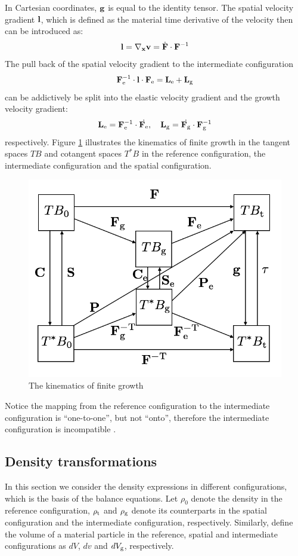 In Cartesian coordinates, $\bold{g}$ is equal to the identity tensor. The spatial velocity gradient $\bold{l}$, which is defined as the material time derivative of the velocity then can be introduced as:
\begin{equation}
\bold{l} = \nabla_{\bold{x}} \bold{v} = \dot{\bold{F}} \cdot \bold{F}^{-1}
\end{equation}
The pull back of the spatial velocity gradient to the intermediate configuration
\begin{equation}
\bold{F}_{\mathrm{e}}^{-1} \cdot \bold{l} \cdot \bold{F}_{\mathrm{e}} = \bold{L}_{\mathrm{e}} + \bold{L}_{\mathrm{g}}
\end{equation} 
can be addictively be split into the elastic velocity gradient and the growth velocity gradient:
\begin{equation} \label{eq:L}
\bold{L}_\mathrm{e} = \bold{F}_\mathrm{e}^{-1} \cdot \dot{\bold{F}_\mathrm{e}}, \quad \bold{L}_\mathrm{g} = \dot{\bold{F}_\mathrm{g}} \cdot \bold{F}_\mathrm{g}^{-1} 
\end{equation}
respectively. Figure \ref{fig:configurations} illustrates the kinematics of finite growth in the tangent spaces $TB$ and cotangent spaces $T^*B$ in the reference configuration, the intermediate configuration and the spatial configuration.

\begin{figure}[H]
   \centering
   \includegraphics[width=.5\textwidth]{./figures/configurations.png} %
   \caption{The kinematics of finite growth}
   \label{fig:configurations}
\end{figure}

Notice the mapping from the reference configuration to the intermediate configuration is ``one-to-one'', but not ``onto'', therefore the intermediate configuration is incompatible \cite{Cowin}.

\subsection{Density transformations}
In this section we consider the density expressions in different configurations, which is the basis of the balance equations. Let $\rho_0$ denote the density in the reference configuration, $\rho_{\mathrm{t}}$ and $\rho_{\mathrm{g}}$ denote its counterparts in the spatial configuration and the intermediate configuration, respectively. Similarly, define the volume of a material particle in the reference,  spatial and intermediate configurations as $dV$, $dv$ and $dV_{\mathrm{g}}$, respectively.

